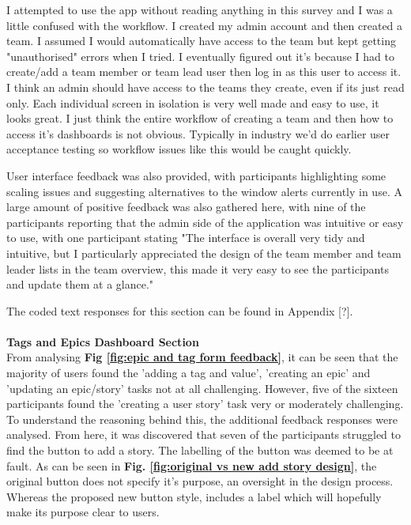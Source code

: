 \documentclass[l4proj.tex]{subfiles}
\begin{document}
I attempted to use the app without reading anything in this survey and I was a little confused with the workflow. I created my admin account and then created a team. I assumed I would automatically have access to the team but kept getting "unauthorised" errors when I tried. I eventually figured out it's because I had to create/add a team member or team lead user then log in as this user to access it. I think an admin should have access to the teams they create, even if its just read only. Each individual screen in isolation is very well made and easy to use, it looks great. I just think the entire workflow of creating a team and then how to access it's dashboards is not obvious. Typically in industry we'd do earlier user acceptance testing so workflow issues like this would be caught quickly.

User interface feedback was also provided, with participants highlighting some scaling issues and suggesting alternatives to the window alerts currently in use. A large amount of positive feedback was also gathered here, with nine of the participants reporting that the admin side of the application was intuitive or easy to use, with one participant stating "The interface is overall very tidy and intuitive, but I particularly appreciated the design of the team member and team leader lists in the team overview, this made it very easy to see the participants and update them at a glance." 

The coded text responses for this section can be found in Appendix [?]. \\
\\
\textbf{Tags and Epics Dashboard Section}\\
From analysing \textbf{Fig \ref{fig:epic and tag form feedback}}, it can be seen that the majority of users found the 'adding a tag and value', 'creating an epic' and 'updating an epic/story' tasks not at all challenging. However, five of the sixteen participants found the 'creating a user story' task very or moderately challenging. To understand the reasoning behind this, the additional feedback responses were analysed. From here, it was discovered that seven of the participants struggled to find the button to add a story. The labelling of the button was deemed to be at fault. As can be seen in \textbf{Fig. \ref{fig:original vs new add story design}}, the original button does not specify it's purpose, an oversight in the design process. Whereas the proposed new button style, includes a label which will hopefully make its purpose clear to users. 
\end{document}

